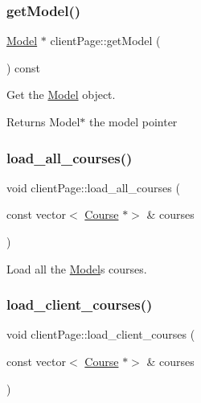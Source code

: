 \subsubsection{\texorpdfstring{get\+Model()}{getModel()}}
{\footnotesize\ttfamily \hyperlink{classModel}{Model} $\ast$ client\+Page\+::get\+Model (\begin{DoxyParamCaption}{ }\end{DoxyParamCaption}) const}



Get the \hyperlink{classModel}{Model} object. 

\begin{DoxyReturn}{Returns}
Model$\ast$ the model pointer 
\end{DoxyReturn}
\mbox{\label{classclientPage_ae5b2455576f3b750131cd21b5bb08430}} 
\subsubsection{\texorpdfstring{load\+\_\+all\+\_\+courses()}{load\_all\_courses()}}
{\footnotesize\ttfamily void client\+Page\+::load\+\_\+all\+\_\+courses (\begin{DoxyParamCaption}\item[{const vector$<$ \hyperlink{classCourse}{Course} $\ast$$>$ \&}]{courses }\end{DoxyParamCaption})}



Load all the \hyperlink{classModel}{Model}\textquotesingle{}s courses. 

\mbox{\label{classclientPage_af7655cb029199e82bb1116969bc695e2}} 
\subsubsection{\texorpdfstring{load\+\_\+client\+\_\+courses()}{load\_client\_courses()}}
{\footnotesize\ttfamily void client\+Page\+::load\+\_\+client\+\_\+courses (\begin{DoxyParamCaption}\item[{const vector$<$ \hyperlink{classCourse}{Course} $\ast$$>$ \&}]{courses }\end{DoxyParamCaption})}



